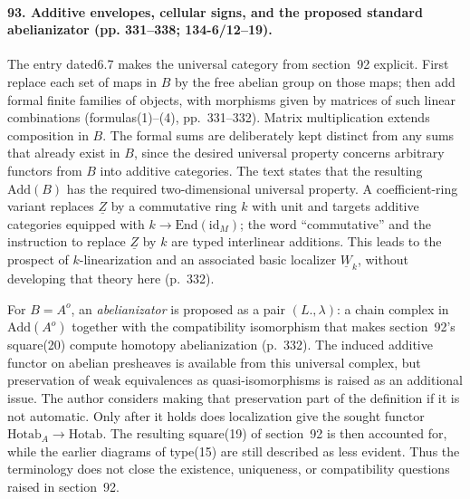 \paragraph{93. Additive envelopes, cellular signs, and the proposed standard abelianizator (pp. 331--338; 134-6/12--19).}
The entry dated6.7 makes the universal category from section~92 explicit. First replace each set of maps in $B$ by the free abelian group on those maps; then add formal finite families of objects, with morphisms given by matrices of such linear combinations (formulas(1)--(4), pp.~331--332). Matrix multiplication extends composition in $B$. The formal sums are deliberately kept distinct from any sums that already exist in $B$, since the desired universal property concerns arbitrary functors from $B$ into additive categories. The text states that the resulting $\mathrm{Add}(B)$ has the required two-dimensional universal property. A coefficient-ring variant replaces $\underline Z$ by a commutative ring $k$ with unit and targets additive categories equipped with $k\to\mathrm{End}(\mathrm{id}_M)$; the word ``commutative'' and the instruction to replace $\underline Z$ by $k$ are typed interlinear additions. This leads to the prospect of $k$-linearization and an associated basic localizer $\underline W_k$, without developing that theory here (p.~332).

For $B=A^o$, an \emph{abelianizator} is proposed as a pair $(L.,\lambda)$: a chain complex in $\mathrm{Add}(A^o)$ together with the compatibility isomorphism that makes section~92's square(20) compute homotopy abelianization (p.~332). The induced additive functor on abelian presheaves is available from this universal complex, but preservation of weak equivalences as quasi-isomorphisms is raised as an additional issue. The author considers making that preservation part of the definition if it is not automatic. Only after it holds does localization give the sought functor $\mathrm{Hotab}_A\to\mathrm{Hotab}$. The resulting square(19) of section~92 is then accounted for, while the earlier diagrams of type(15) are still described as less evident. Thus the terminology does not close the existence, uniqueness, or compatibility questions raised in section~92.

